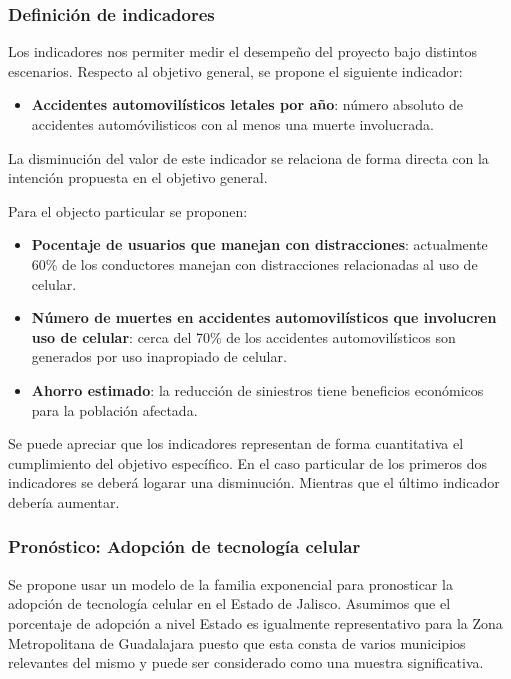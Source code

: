 \documentclass{article}
\begin{document}
\subsubsection{Definición de indicadores}

Los indicadores nos permiter medir el desempeño del proyecto bajo distintos escenarios.
Respecto al objetivo general, se propone el siguiente indicador:

\begin{itemize}
	\item \textbf{Accidentes automovilísticos letales por año}: número absoluto de accidentes automóvilisticos
con al menos una muerte involucrada.
\end{itemize}

La disminución del valor de este indicador se relaciona de forma directa con la intención propuesta en el objetivo general.

Para el objecto particular se proponen:

\begin{itemize}
	\item \textbf{Pocentaje de usuarios que manejan con distracciones}: actualmente 60\% de los conductores manejan con
distracciones relacionadas al uso de celular.
	\item \textbf{Número de muertes en accidentes automovilísticos que involucren uso de celular}: cerca del 70\% de los
accidentes automovilísticos son generados por uso inapropiado de celular.
	\item \textbf{Ahorro estimado}: la reducción de siniestros tiene beneficios económicos para la población
afectada.
\end{itemize}

Se puede apreciar que los indicadores representan de forma cuantitativa el cumplimiento del objetivo específico.
En el caso particular de los primeros dos indicadores se deberá logarar una disminución. Mientras que el último
indicador debería aumentar.

\subsubsection{Pronóstico: Adopción de tecnología celular}

Se propone usar un modelo de la familia exponencial para pronosticar la adopción de tecnología celular en el Estado
de Jalisco. Asumimos que el porcentaje de adopción a nivel Estado es igualmente representativo para la Zona
Metropolitana de Guadalajara puesto que esta consta de varios municipios relevantes del mismo y
puede ser considerado como una muestra significativa.
\end{document}
